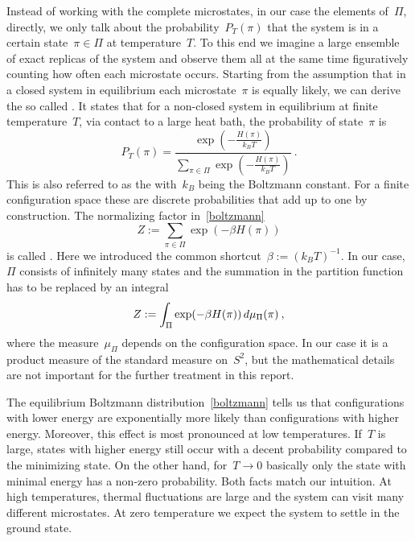 Instead of working with the complete microstates, in our case the elements
of~$\Pi$, directly, we only talk about the probability~$P_{T}(\pi)$ that the
system is in a certain state~$\pi \in \Pi$ at temperature~$T$. To this end we
imagine a large ensemble of exact replicas of the system and observe them all at
the same time figuratively counting how often each microstate occurs. Starting
from the assumption that in a closed system in equilibrium each microstate~$\pi$
is equally likely, we can derive the so called . It
states that for a non-closed system in equilibrium at finite temperature~$T$,
\eg{} via contact to a large heat bath, the probability of state~$\pi$ is
%
\begin{equation}\label{boltzmann}
  P_{T}(\pi) = \frac{\exp \left(- \frac{H(\pi)}{k_B T}\right)}
  {\sum_{\pi \in \Pi} \exp \left(- \frac{H(\pi)}{k_B T}\right)}\:.
\end{equation}
%
This is also referred to as the 
with~$k_B$ being the Boltzmann constant. For a finite configuration space these
are discrete probabilities that add up to one by construction.  The normalizing
factor in~\eqref{boltzmann}
%
\begin{equation}
  Z := \sum_{\pi \in \Pi} \exp(-\beta H(\pi))
\end{equation}
%
is called . Here we introduced the common
shortcut~$\beta := {(k_B T)}^{-1}$. In our case,~$\Pi$ consists of infinitely
many states and the summation in the partition function has to be replaced by an
integral
%
\begin{equation}
  Z := \int_{\Pi} \exp(-\beta H(\pi)) \,d\mu_{\Pi}(\pi)\:,
\end{equation}
%
where the measure~$\mu_{\Pi}$ depends on the configuration space. In our case it
is a product measure of the standard measure on~$S^2$, but the mathematical
details are not important for the further treatment in this report.

The equilibrium Boltzmann distribution~\eqref{boltzmann} tells us that
configurations with lower energy are exponentially more likely than
configurations with higher energy. Moreover, this effect is most pronounced at
low temperatures. If~$T$ is large, states with higher energy still occur with a
decent probability compared to the minimizing state. On the other hand, for~$T
\to 0$ basically only the state with minimal energy has a non-zero probability.
Both facts match our intuition. At high temperatures, thermal fluctuations are
large and the system can visit many different microstates. At zero temperature
we expect the system to settle in the ground state.

